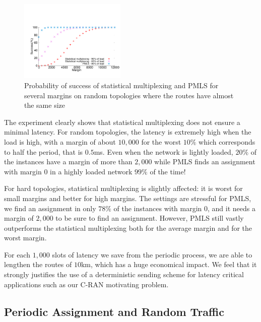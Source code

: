 \documentclass[a4paper,10pt]{article}
\begin{document}
         \begin{figure}
       \begin{center}
      \includegraphics[width = 0.45\textwidth]{stochasticbad.pdf}
      \end{center}
      \caption{Probability of success of statistical multiplexing and PMLS for several margins on random topologies where the routes have almost the same size}
      \label{fig:stobad}   
     \end{figure}    
     
    The experiment clearly shows that statistical multiplexing does not ensure a minimal latency. 
    For random topologies, the latency is extremely high when the load is high, with a margin of about $10,000$ for the worst $10\%$ which corresponds to half the period, that is $0.5$ms. Even when the network is lightly loaded, $20\%$ of the instances have a margin of more than $2,000$ while PMLS finds an assignment with margin $0$ in a highly loaded network $99\%$ of the time! 
    
    For hard topologies, statistical multiplexing is slightly affected: it is worst for small margins and better for high margins. The settings are stressful for PMLS, we find an assignment in only $78\%$ of the instances with margin $0$, and it needs a margin of $2,000$ to be sure to find an assignment. However, PMLS still vastly outperforms the statistical multiplexing both for the average margin and for the worst margin. 
    
    For each $1,000$ slots of latency we save from the periodic process, we are able to lengthen the routes of $10$km, which has a huge economical impact. We feel that it strongly justifies the use of a deterministic sending scheme for latency critical applications such as our C-RAN motivating problem.    
     
    \subsection{Periodic Assignment and Random Traffic}
\end{document}
